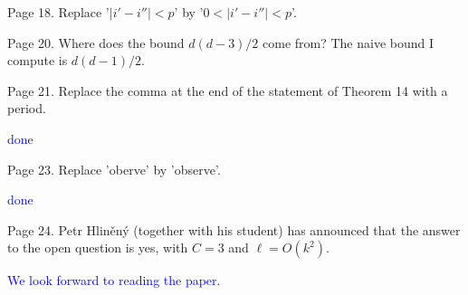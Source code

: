 \documentclass[12pt]{article}
\begin{document}
Page 18.  Replace '$|i'-i''| < p$' by  '$0< |i'-i''| < p$'.

Page 20.  Where does the bound $d(d-3)/2$ come from?  The naive bound I
compute is $d(d-1)/2$.

Page 21.  Replace the comma at the end of the statement of Theorem 14
with a period.

\textcolor{blue}{done}

Page 23. Replace 'oberve' by 'observe'.

\textcolor{blue}{done}

Page 24. Petr Hliněný (together with his student) has announced that
the answer to the open question is yes, with $C=3$ and $\ell=O(k^2)$.

\textcolor{blue}{We look forward to reading the paper.}
\end{document}
